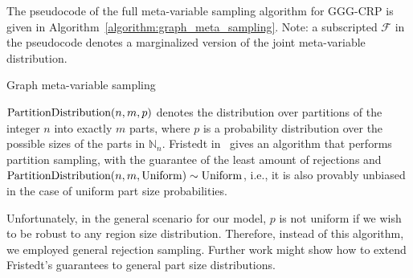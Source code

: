 The pseudocode of the full meta-variable sampling algorithm for GGG-CRP is given in Algorithm~\ref{algorithm:graph_meta_sampling}. Note: a subscripted $\mathcal{F}$ in the pseudocode denotes a marginalized version of the joint meta-variable distribution.
\begin{algorithm}[H]
\caption{Graph meta-variable sampling}
\label{algorithm:graph_meta_sampling}
\begin{algorithmic}
\ENDFOR
{}
\end{algorithmic}
\end{algorithm} 

$\text{PartitionDistribution}\mathopen{}\left(n,m,p\right)$ denotes the distribution over partitions of the integer $n$ into exactly $m$ parts, where $p$ is a probability distribution over the possible sizes of the parts in $\mathbb{N}_{n}$. Fristedt in~\cite{fristedt_structure_1993} gives an algorithm that performs partition sampling, with the guarantee of the least amount of rejections and $\text{PartitionDistribution}\mathopen{}\left(n,m,\text{Uniform}\right) \sim \text{Uniform}$, i.e., it is also provably unbiased in the case of uniform part size probabilities. 

Unfortunately, in the general scenario for our model, $p$ is not uniform if we wish to be robust to any region size distribution. Therefore, instead of this algorithm, we employed general rejection sampling. Further work might show how to extend Fristedt's guarantees to general part size distributions.
    
